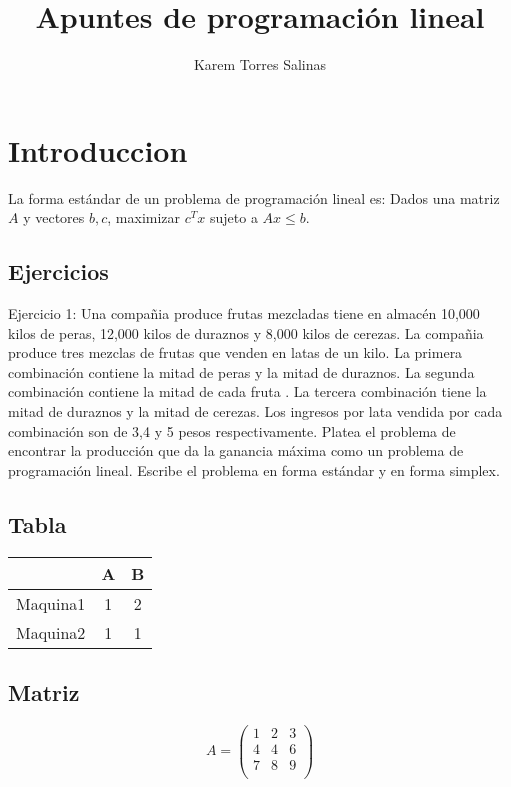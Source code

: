 \documentclass{article}
\title{Apuntes de programación lineal}
\author{Karem Torres Salinas}
\begin{document}
\maketitle
\tableofcontents
\label{sec:introduccion}
\section{Introduccion}



La forma estándar de un problema de programación lineal es: Dados una
matriz $A$ y vectores $b,c$, maximizar $c^Tx$ sujeto a $Ax\leq b$.

\subsection{Ejercicios}
Ejercicio 1:
Una compañia produce frutas mezcladas tiene en almacén 10,000 kilos de
peras, 12,000 kilos de duraznos y 8,000 kilos de cerezas. La compañia
produce tres mezclas de frutas que venden en latas de un kilo. La
primera combinación contiene la mitad de peras y la mitad de
duraznos. La segunda combinación contiene la mitad de cada fruta . La
tercera combinación tiene la mitad de duraznos y la mitad de
cerezas. Los ingresos por lata vendida por cada combinación son de 3,4
y 5 pesos respectivamente. Platea el problema de encontrar la
producción que da la ganancia máxima como un problema de programación
lineal. Escribe el problema en forma estándar y en forma simplex.


\subsection{Tabla}

\begin{tabular}{|c|c|c|}
  \hline
  &A&B\\
  \hline
  Maquina1 &1&2\\
  Maquina2 &1&1 \\
  \hline
\end{tabular}


\subsection{Matriz}

\begin{equation*}
  \label{eq:1}
 A= \begin{pmatrix}
    1&2&3\\
    4&4&6\\
    7&8&9\\
  \end{pmatrix}
\end{equation*}
\end{document}
